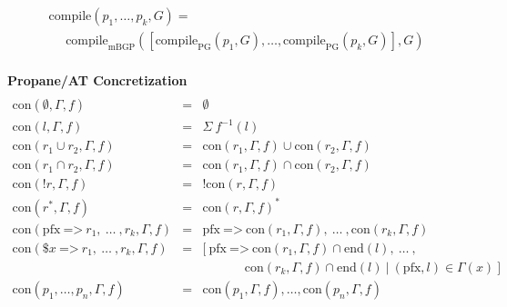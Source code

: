 \documentclass[twocolumn, openany]{sig-alternate-10pt}
\newcommand{\Path}{\texttt{=>}}
\newcommand{\Con}{\mathrm{con}}
\newcommand{\Pfx}{\mathrm{pfx}}%
\newcommand{\Compile}{\ensuremath{\mathrm{compile}}}
\newcommand{\hdr}[2]{\flushleft \chdr{\hspace{5mm}#1}{#2}}
\newcommand{\chdr}[2]{\textbf{#1} {#2} \\ \centering}%
\begin{document}
\begin{figure*}[h!]
\begin{minipage}[t]{.5\linewidth}
\[\begin{array}{l}
     \Compile( p_1, \dots, p_k, G) = \\
     ~~~~~~ \text{compile}_\text{mBGP}([\text{compile}_\text{PG}(p_1,G), \dots, \text{compile}_\text{PG}(p_k,G)], G) \\
  \end{array} \]%
  \end{minipage}%

  \vspace{3em}

  \vspace*{-2\baselineskip}
  \begin{minipage}[t]{1.01\linewidth}
  \hdr{Propane/AT Concretization}{}
  \vspace*{-2\baselineskip}
  \[ \begin{array}{lcl}
     \\
     \Con(\emptyset, \Gamma, f)      &=& \emptyset \\
     \Con(l, \Gamma, f)              &=& \Sigma ~ f^{-1}(l) \\
     \Con(r_1 \cup r_2, \Gamma, f)   &=& \Con(r_1,\Gamma,f) \cup \Con(r_2,\Gamma,f) \\
     \Con(r_1 \cap r_2, \Gamma, f)   &=& \Con(r_1,\Gamma,f) \cap \Con(r_2,\Gamma,f) \\
     \Con(!r, \Gamma, f)             &=& !\Con(r,\Gamma,f) \\
     \Con(r^*, \Gamma, f)            &=& \Con(r,\Gamma,f)^* \\%
     \Con(\Pfx ~\Path~ r_1, ~\dots~, r_k, \Gamma, f) &=&
          \Pfx ~\Path~ \Con(r_1,\Gamma,f), ~\dots~, \Con(r_k,\Gamma,f)  \\%
     \Con(\$x ~\Path~ r_1, ~\dots~, r_k, \Gamma, f) &=&%
         [~ \Pfx ~\Path~ \Con(r_1,\Gamma,f) \cap \text{end}(l), ~\dots~, \\%
         & & ~~~~~~~~~~~~~~~ \Con(r_k,\Gamma,f) \cap \text{end}(l) ~\vert~ (\Pfx,l) \in \Gamma(x) ~]  \\%
     \Con(p_1, \dots, p_n, \Gamma,f) &=& \Con(p_1, \Gamma,f), \dots, \Con(p_n, \Gamma,f) \\%

  \end{array} \]%
  \end{minipage}%

  \vspace{2em}


\end{figure*}
\end{document}
